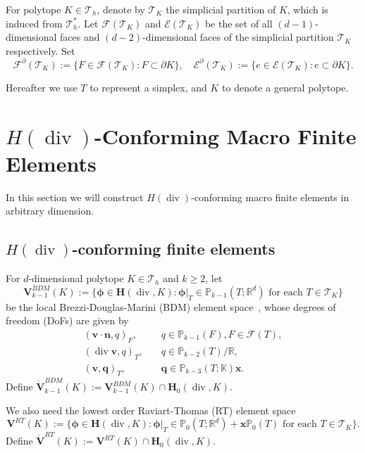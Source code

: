 \documentclass[10pt]{amsart}
\renewcommand{\div}{\operatorname{div}}
\numberwithin{equation}{section}
\begin{document}
For polytope $K\in \mathcal T_h$, denote by $\mathcal T_K$ the simplicial partition of $K$, which is induced from $\mathcal T_h^*$. Let $\mathcal{F}(\mathcal T_K)$ and $\mathcal{E}(\mathcal T_K)$ be the set of all $(d-1)$-dimensional faces and $(d-2)$-dimensional faces of the simplicial partition $\mathcal T_K$ respectively. Set 
\[
\mathcal{F}^{\partial}(\mathcal T_K):=\{F\in\mathcal{F}(\mathcal T_K): F\subset\partial K\},\quad \mathcal{E}^{\partial}(\mathcal T_K):=\{e\in\mathcal{E}(\mathcal T_K): e\subset\partial K\}.
\]

Hereafter we use $T$ to represent a simplex, and $K$ to denote a general polytope.




\section{$H(\div)$-Conforming Macro Finite Elements}\label{sec:divmacrofem}

In this section we will construct $H(\div)$-conforming macro finite elements in arbitrary dimension.
\subsection{$H(\div)$-conforming finite elements}
For $d$-dimensional polytope $K\in \mathcal T_h$ and $k\geq2$, let 
\[
\boldsymbol{V}_{k-1}^{BDM}(K):=\{\boldsymbol{\phi}\in\boldsymbol{H}(\div, K): \boldsymbol{\phi}|_{T}\in \mathbb P_{k-1}(T;\mathbb R^d) \textrm{ for each } T\in\mathcal T_K\}
\]
be the local Brezzi-Douglas-Marini (BDM) element space~\cite{BrezziDouglasMarini1986,BrezziDouglasDuranFortin1987,Nedelec:1986family}, whose degrees of freedom (DoFs) are given by \cite{ChenHuang2021divdiv}
\begin{align}
(\boldsymbol{v}\cdot\boldsymbol{n}, q)_F, & \quad q\in \mathbb P_{k-1}(F), F\in\mathcal F(T), \label{BDMdof1} \\
(\div\boldsymbol{v}, q)_T, & \quad q\in \mathbb P_{k-2}(T)/\mathbb R, \label{BDMdof2} \\
(\boldsymbol{v}, \boldsymbol{q})_T, & \quad \boldsymbol{q}\in \mathbb P_{k-3}(T;\mathbb K)\boldsymbol{x}. \label{BDMdof3}
\end{align}
Define $\mathring{\boldsymbol{V}}_{k-1}^{BDM}(K):=\boldsymbol{V}_{k-1}^{BDM}(K)\cap \boldsymbol{H}_0(\div, K)$.

We also need the lowest order Raviart-Thomas (RT) element space~\cite{BrezziDouglasMarini1986,BrezziDouglasDuranFortin1987,Nedelec:1986family}
\[
\boldsymbol{V}^{RT}(K):=\{\boldsymbol{\phi}\in\boldsymbol{H}(\div, K): \boldsymbol{\phi}|_{T}\in \mathbb P_{0}(T;\mathbb R^d)+\boldsymbol{x}\mathbb P_{0}(T) \textrm{ for each } T\in\mathcal T_K\}.
\]
Define $\mathring{\boldsymbol{V}}^{RT}(K):=\boldsymbol{V}^{RT}(K)\cap \boldsymbol{H}_0(\div, K)$.
\end{document}
